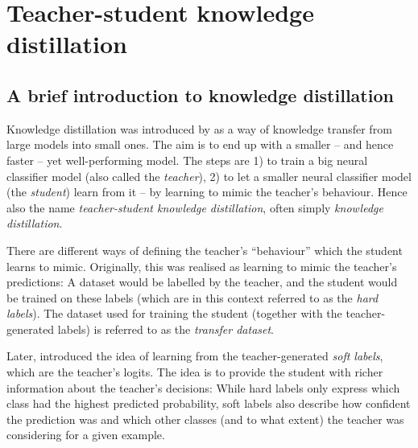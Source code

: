 \documentclass[bsc,frontabs,twoside,singlespacing,parskip,deptreport]{infthesis}
\begin{document}
{  \section{Teacher-student knowledge distillation}{
    \label{sec:KD}
    \subsection{A brief introduction to knowledge distillation}{
      \label{sec:KD-intro}
      Knowledge distillation was introduced by \citep{Bucila_2006} as a way of knowledge transfer from large models into small ones. The aim is to end up with a smaller -- and hence faster -- yet well-performing model. The steps are 1) to train a big neural classifier model (also called the \textit{teacher}), 2) to let a smaller neural classifier model (the \textit{student}) learn from it -- by learning to mimic the teacher's behaviour. Hence also the name \textit{teacher-student knowledge distillation}, often simply \textit{knowledge distillation}.
      
      There are different ways of defining the teacher's ``behaviour'' which the student learns to mimic. Originally, this was realised as learning to mimic the teacher's predictions: A dataset would be labelled by the teacher, and the student would be trained on these labels (which are in this context referred to as the \textit{hard labels}). The dataset used for training the student (together with the teacher-generated labels) is referred to as the \textit{transfer dataset}.

      Later, \citet{Ba_2013} introduced the idea of learning from the teacher-generated \textit{soft labels}, which are the teacher's logits. The idea is to provide the student with richer information about the teacher's decisions: While hard labels only express which class had the highest predicted probability, soft labels also describe how confident the prediction was and which other classes (and to what extent) the teacher was considering for a given example.

}}}
\end{document}
